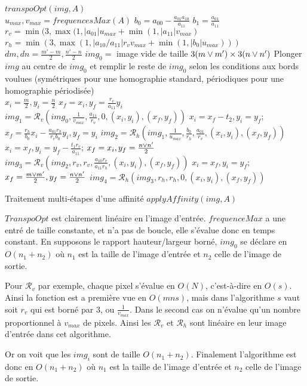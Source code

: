    \begin{algorithme}
    $transpoOpt(img,A)$\;\ \\
    $u_{max}, v_{max} = frequencesMax(A)$\;
	$b_0 = a_{00}-\frac{a_{01}a_{10}}{a_{11}}$\;
	$b_1 = \frac{a_{01}}{a_{11}}$\;
	$r_v = \min(3,\max (1,|a_{01}|u_{max}+\min (1,|a_{11}|v_{max})$\;
	$r_h = \min(3,\max (1,|a_{10}/a_{11}|r_vv_{max}+\min (1,|b_0|u_{max})))$\;
	\ \\
	$dm,dn = \frac{m'-m}{2},\frac{n'-n}{2}$\;
	$img_0 = $ image vide de taille $3(m \vee m') \times 3(n \vee n')$\;
	Plonger $img$ au centre de $img_0$ et remplir le reste de $img_0$ selon les conditions aux bords voulues (symétriques pour une homographie standard, périodiques pour une homographie périodisée)\;
	\ \\
	$x_i = \frac{m}{2}, y_i = \frac{n}{2}$\;
	$x_f = x_i, y_f = \frac{r_v}{a_{11}}y_i$\;
	$img_1 = \mathcal{R}_v(img_0,\frac{1}{v_{max}},\frac{a_{11}}{r_v},0,(x_i,y_i),(x_f,y_f))$\;
	$x_i = x_f-t_2, y_i = y_f$;
	$x_f = \frac{r_h}{b_0} x_i - \frac{a_{01}r_h}{r_v b_0} y_i, y_f = y_i$\;
	$img_2 = \mathcal{R}_h(img_1,\frac{1}{u_{max}},\frac{b_0}{r_h},\frac{a_{01}}{r_v},(x_i,y_i),(x_f,y_f))$\;
	$x_i = x_f, y_i = y_f - \frac{t_1r_v}{a_{11}}$;
	$x_f = x_i, y_f = \frac{n \vee n'}{2}$\;
	$img_3 = \mathcal{R}_v(img_2,r_v,r_v,\frac{a_{10}r_v}{a_{11}r_h},(x_i,y_i),(x_f,y_f))$\;
	$x_i = x_f, y_i = y_f$;
	$x_f = \frac{m \vee m'}{2}, y_f = \frac{n \vee n'}{2}$\;
	$img_4 = \mathcal{R}_h(img_3,r_h,r_h,0,(x_i,y_i),(x_f,y_f))$\;
    \caption{Traitement multi-étapes d'une affinité $applyAffinity(img,A)$}
    \label{algoPresqueAussiUniqueQueLesDeuxAutres}
   \end{algorithme}
   
   
   
   
   $TranspoOpt$ est clairement linéaire en l'image d'entrée. $frequenceMax$ a une entré de taille constante, et n'a pas de boucle, elle s'évalue donc en temps constant. En supposons le rapport hauteur/largeur borné, $img_0$ se déclare en $O(n_1+n_2)$ où $n_1$ est la taille de l'image d'entrée et $n_2$ celle de l'image de sortie.
   
   Pour ${\mathcal R}_v$ par exemple, chaque pixel s'évalue en $O(N)$, c'est-à-dire en $O(s)$. Ainsi la fonction est a première vue en $O(mns)$, mais dans l'algorithme $s$ vaut soit $r_v$ qui est borné par $3$, ou $\frac{1}{v_{max}}$. Dans le second cas on n'évalue qu'un nombre proportionnel à $v_{max}$ de pixels. Ainsi les ${\mathcal R}_v$ et ${\mathcal R}_h$ sont linéaire en leur image d'entrée dans cet algorithme.
   
   Or on voit que les $img_i$ sont de taille $O(n_1+n_2)$.
   \medbreak
   Finalement l'algorithme est donc en $O(n_1+n_2)$ où $n_1$ est la taille de l'image d'entrée et $n_2$ celle de l'image de sortie.
